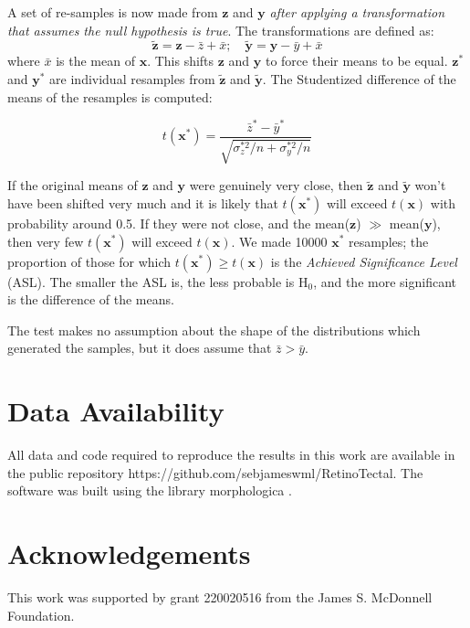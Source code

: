 \documentclass[9pt]{elife} %
\begin{document}
A set of re-samples is now made from $\textbf{z}$ and $\textbf{y}$ \emph{after applying a transformation that assumes the null hypothesis is true}.
The transformations are defined as:
%
$$ \tilde{\textbf{z}} = \textbf{z} - \bar{z} + \bar{x}; \quad \tilde{\textbf{y}} = \textbf{y} - \bar{y} + \bar{x} $$
%
where $\bar{x}$ is the mean of $\textbf{x}$. This shifts $\textbf{z}$ and $\textbf{y}$ to force their means to be equal.
$\textbf{z}^*$ and $\textbf{y}^*$ are individual resamples from $\tilde{\textbf{z}}$ and $\tilde{\textbf{y}}$.
The Studentized difference of the means of the resamples is computed:

$$t(\textbf{x}^*) =  \frac{\bar{z}^* - \bar{y}^*}{\sqrt{\sigma_{z}^{*2}/n + \sigma_{y}^{*2}/n} } $$

If the original means of $\textbf{z}$ and $\textbf{y}$ were genuinely very close, then $\tilde{\textbf{z}}$ and $\tilde{\textbf{y}}$ won't have been shifted very much and it is likely that $t(\textbf{x}^*)$ will exceed $t(\textbf{x})$ with probability around 0.5.
If they were not close, and the mean($\textbf{z}$) $\gg$ mean($\textbf{y}$), then very few $t(\textbf{x}^*)$ will exceed $t(\textbf{x})$.
We made 10000 $\textbf{x}^*$ resamples; the proportion of those for which $t(\textbf{x}^*) \geq t(\textbf{x})$ is the \emph{Achieved Significance Level} (ASL).
The smaller the ASL is, the less probable is H$_0$, and the more significant is the difference of the means.

The test makes no assumption about the shape of the distributions which generated the samples, but it does assume that $\bar{z} > \bar{y}$.

\section{Data Availability}

All data and code required to reproduce the results in this work are available in the public repository
{https://github.com/sebjameswml/RetinoTectal}.
The software was built using the library morphologica \citep{james_morphologica_2022}.

\section{Acknowledgements}

This work was supported by grant 220020516 from the James S. McDonnell Foundation.


\end{document}
